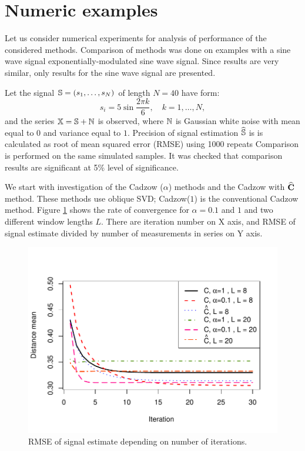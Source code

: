 \documentclass[12pt,a4paper,fleqn,leqno]{article}
\begin{document}
\section{Numeric examples}
\label{sec:simul}
Let us consider numerical experiments for analysis of performance of the considered methods. Comparison of methods was done on examples with a sine wave signal exponentially-modulated sine wave signal.
Since results are very similar, only results for the sine wave signal are presented.

Let the signal $\mathbb{S} = (s_{1}, \ldots, s_N)$ of length $N = 40$ have form:
\begin{equation*}
s_{i} = 5\sin{\frac{2 \pi k}{6}}, \quad k = 1, \ldots, N,
\end{equation*}
and the series $\mathbb{X} = \mathbb{S} + \mathbb{N}$ is observed, where  $\mathbb{N}$ is Gaussian white noise with mean equal to $0$ and variance equal to $1$. Precision of signal estimation $\widehat{\mathbb{S}}$ is is calculated as root of mean squared error (RMSE) using 1000 repeats Comparison is performed on the same simulated samples. It was checked that comparison results are significant at 5\% level of significance.

We start with investigation of the Cadzow ($\alpha$) methods and the Cadzow with $\widehat {\mathbf{C}}$ method. These methods use oblique SVD; Cadzow($1$) is the conventional Cadzow method. Figure \ref{img_cadzowspeed2} shows the rate of convergence for $\alpha = 0.1$ and $1$ and two different window lengths $L$. There are iteration number on X axis, and RMSE of signal estimate divided by number of measurements in series on Y axis.

\begin{figure}[!hhh]
\begin{center}
\includegraphics[width = \textwidth]{cadzowspeed_2.pdf}
\caption{RMSE of signal estimate depending on number of iterations.}
\label{img_cadzowspeed2}
\end{center}
\end{figure}
\end{document}
